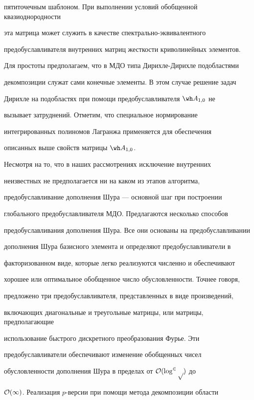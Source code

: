 пятиточечным шаблоном. При выполнении условий обобщенной квазиоднородности


эта матрица может служить в качестве спектрально-эквивалентного


предобуславливателя внутренних матриц жесткости криволинейных элементов.


Для простоты предполагаем, что в МДО типа Дирихле-Дирихле подобластями


декомпозиции служат сами конечные элементы. В этом случае решение задач


Дирихле на подобластях при помощи предобуславливателя $\wh A_{1,0}$ не


вызывает затруднений. Отметим, что специальное нормирование


интегрированных полиномов Лагранжа применяется для обеспечения 


описанных выше свойств матрицы $\wh A_{1,0}$.





Несмотря на то, что в наших рассмотрениях исключение внутренних


неизвестных не предполагается ни на каком из этапов алгоритма,


предобуславливание дополнения Шура --- основной шаг при построении


глобального предобуславливателя МДО. Предлагаются несколько способов


предобуславливания дополнения Шура. Все они основаны на предобуславливании


дополнения Шура базисного элемента и определяют предобуславливатели в


факторизованном виде, которые легко реализуются численно и обеспечивают


хорошее или оптимальное обобщенное число обусловленности. Точнее говоря,


предложено три предобуславливателя, представленных в виде произведений,


включающих диагональные и треугольные матрицы, или матрицы, предполагающие


использование быстрого дискретного преобразования Фурье. Эти


предобуславливатели обеспечивают изменение обобщенных чисел


обусловленности дополнения Шура в пределах от $\cal O(\log^2p)$ до


$\cal O(1)$. Реализация $p$-версии при помощи метода декомпозиции области


